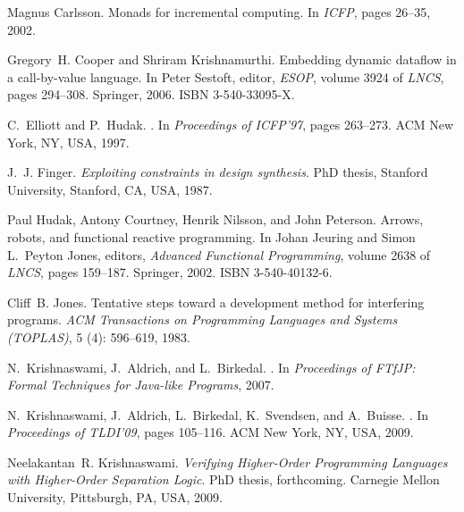 \documentclass[natbib]{sigplanconf}
\begin{document}
\begin{thebibliography}{26}
Magnus Carlsson.
\newblock Monads for incremental computing.
\newblock In \emph{ICFP}, pages 26--35, 2002.

Gregory~H. Cooper and Shriram Krishnamurthi.
\newblock Embedding dynamic dataflow in a call-by-value language.
\newblock In Peter Sestoft, editor, \emph{ESOP}, volume 3924 of \emph{LNCS},
  pages 294--308. Springer, 2006.
\newblock ISBN 3-540-33095-X.

C.~Elliott and P.~Hudak.
.
\newblock In \emph{Proceedings of ICFP'97}, pages 263--273. ACM New York, NY,
  USA, 1997.

J.~J. Finger.
\newblock \emph{Exploiting constraints in design synthesis}.
\newblock PhD thesis, Stanford University, Stanford, CA, USA, 1987.

Paul Hudak, Antony Courtney, Henrik Nilsson, and John Peterson.
\newblock Arrows, robots, and functional reactive programming.
\newblock In Johan Jeuring and Simon L.~Peyton Jones, editors, \emph{Advanced
  Functional Programming}, volume 2638 of \emph{LNCS}, pages 159--187.
  Springer, 2002.
\newblock ISBN 3-540-40132-6.

Cliff~B. Jones.
\newblock Tentative steps toward a development method for interfering programs.
\newblock \emph{ACM Transactions on Programming Languages and Systems
  (TOPLAS)}, 5 (4): 596--619, 1983.

N.~Krishnaswami, J.~Aldrich, and L.~Birkedal.
.
\newblock In \emph{Proceedings of FTfJP: Formal Techniques for Java-like
  Programs}, 2007.

N.~Krishnaswami, J.~Aldrich, L.~Birkedal, K.~Svendsen, and A.~Buisse.
.
\newblock In \emph{Proceedings of TLDI'09}, pages 105--116. ACM New York, NY,
  USA, 2009.

Neelakantan~R. Krishnaswami.
\newblock \emph{Verifying Higher-Order Programming Languages with Higher-Order
  Separation Logic}.
\newblock PhD thesis, forthcoming. Carnegie Mellon University, Pittsburgh, PA,
  USA, 2009.


\end{thebibliography}
\end{document}
